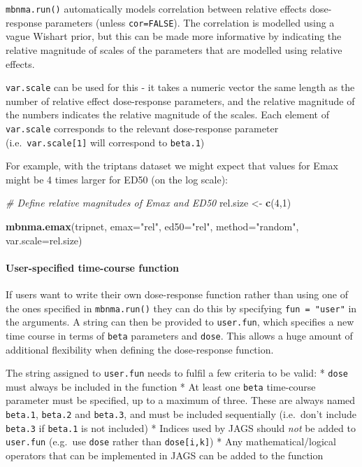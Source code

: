 \documentclass[]{article}
\newenvironment{Shaded}{\begin{snugshade}}{\end{snugshade}}
\newcommand{\CommentTok}[1]{\textcolor[rgb]{0.56,0.35,0.01}{\textit{#1}}}
\newcommand{\DataTypeTok}[1]{\textcolor[rgb]{0.13,0.29,0.53}{#1}}
\newcommand{\DecValTok}[1]{\textcolor[rgb]{0.00,0.00,0.81}{#1}}
\newcommand{\KeywordTok}[1]{\textcolor[rgb]{0.13,0.29,0.53}{\textbf{#1}}}
\newcommand{\NormalTok}[1]{#1}
\newcommand{\StringTok}[1]{\textcolor[rgb]{0.31,0.60,0.02}{#1}}
\let\oldparagraph\paragraph
\renewcommand{\paragraph}[1]{\oldparagraph{#1}\mbox{}}
\begin{document}
\texttt{mbnma.run()} automatically models correlation between relative
effects dose-response parameters (unless \texttt{cor=FALSE}). The
correlation is modelled using a vague Wishart prior, but this can be
made more informative by indicating the relative magnitude of scales of
the parameters that are modelled using relative effects.

\texttt{var.scale} can be used for this - it takes a numeric vector the
same length as the number of relative effect dose-response parameters,
and the relative magnitude of the numbers indicates the relative
magnitude of the scales. Each element of \texttt{var.scale} corresponds
to the relevant dose-response parameter (i.e.~\texttt{var.scale{[}1{]}}
will correspond to \texttt{beta.1})

For example, with the triptans dataset we might expect that values for
Emax might be 4 times larger for ED50 (on the log scale):

\begin{Shaded}
\begin{Highlighting}[]
\CommentTok{# Define relative magnitudes of Emax and ED50}
\NormalTok{rel.size <-}\StringTok{ }\KeywordTok{c}\NormalTok{(}\DecValTok{4}\NormalTok{,}\DecValTok{1}\NormalTok{)}

\KeywordTok{mbnma.emax}\NormalTok{(tripnet, }\DataTypeTok{emax=}\StringTok{"rel"}\NormalTok{, }\DataTypeTok{ed50=}\StringTok{"rel"}\NormalTok{, }\DataTypeTok{method=}\StringTok{"random"}\NormalTok{, }
           \DataTypeTok{var.scale=}\NormalTok{rel.size)}
\end{Highlighting}
\end{Shaded}

\hypertarget{user-specified-time-course-function}{%
\paragraph{User-specified time-course
function}\label{user-specified-time-course-function}}

If users want to write their own dose-response function rather than
using one of the ones specified in \texttt{mbnma.run()} they can do this
by specifying \texttt{fun\ =\ "user"} in the arguments. A string can
then be provided to \texttt{user.fun}, which specifies a new time course
in terms of \texttt{beta} parameters and \texttt{dose}. This allows a
huge amount of additional flexibility when defining the dose-response
function.

The string assigned to \texttt{user.fun} needs to fulfil a few criteria
to be valid: * \texttt{dose} must always be included in the function *
At least one \texttt{beta} time-course parameter must be specified, up
to a maximum of three. These are always named \texttt{beta.1},
\texttt{beta.2} and \texttt{beta.3}, and must be included sequentially
(i.e.~don't include \texttt{beta.3} if \texttt{beta.1} is not included)
* Indices used by JAGS should \emph{not} be added to \texttt{user.fun}
(e.g.~use \texttt{dose} rather than \texttt{dose{[}i,k{]}}) * Any
mathematical/logical operators that can be implemented in JAGS can be
added to the function
\end{document}
